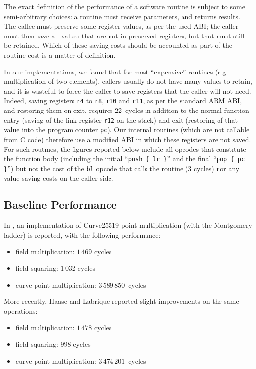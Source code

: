 \documentclass{llncs}
\begin{document}
The exact definition of the performance of a software routine is subject
to some semi-arbitrary choices: a routine must receive parameters, and
returns results. The callee must preserve some register values, as per
the used ABI; the caller must then save all values that are not in
preserved registers, but that must still be retained. Which of these
saving costs should be accounted as part of the routine cost is a matter
of definition.

In our implementations, we found that for most ``expensive'' routines
(e.g. multiplication of two elements), callers usually do not have many
values to retain, and it is wasteful to force the callee to save
registers that the caller will not need. Indeed, saving registers
\verb+r4+ to \verb+r8+, \verb+r10+ and \verb+r11+, as per the standard
ARM ABI, and restoring them on exit, requires 22~cycles in addition to
the normal function entry (saving of the link register \verb+r12+ on the
stack) and exit (restoring of that value into the program counter
\verb+pc+). Our internal routines (which are not callable from C code)
therefore use a modified ABI in which these registers are not saved. For
such routines, the figures reported below include all opcodes that
constitute the function body (including the initial ``\verb+push { lr }+''
and the final ``\verb+pop { pc }+'') but not the cost of the \verb+bl+
opcode that calls the routine (3 cycles) nor any value-saving costs on
the caller side.

\subsection{Baseline Performance}\label{sec:field-ops-baseline}

In \cite{DulHaaHinHutPaaSanSch2015}, an implementation of Curve25519
point multiplication (with the Montgomery ladder) is reported, with
the following performance:
\begin{itemize}

    \item field multiplication: $1\,469$ cycles

    \item field squaring: $1\,032$ cycles

    \item curve point multiplication: $3\,589\,850$~cycles

\end{itemize}

More recently, Haase and Labrique\cite{HaaLab2019} reported slight
improvements on the same operations:
\begin{itemize}

    \item field multiplication: $1\,478$ cycles

    \item field squaring: $998$ cycles

    \item curve point multiplication: $3\,474\,201$~cycles

\end{itemize}
\end{document}
